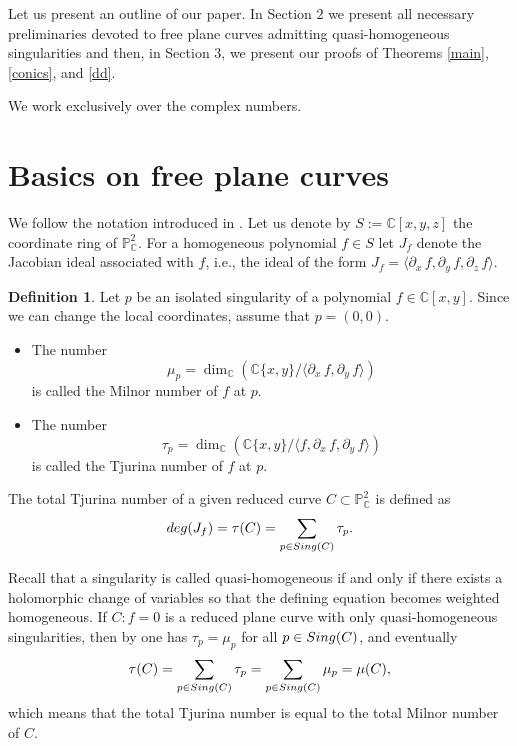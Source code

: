 \documentclass[12pt]{article}
\theoremstyle{plain}
\theoremstyle{definition}
\newtheorem{definition}[thm]{Definition}
\begin{document}
Let us present an outline of our paper. In Section $2$ we present all necessary preliminaries devoted to free plane curves admitting quasi-homogeneous singularities and then, in Section $3$, we present our proofs of Theorems \ref{main}, \ref{conics}, and \ref{dd}.

We work exclusively over the complex numbers.
\section{Basics on free plane curves}

We follow the notation introduced in \cite{Dimca}. Let us denote by $S := \mathbb{C}[x,y,z]$ the coordinate ring of $\mathbb{P}^{2}_{\mathbb{C}}$. For a homogeneous polynomial $f \in S$ let $J_{f}$ denote the Jacobian ideal associated with $f$, i.e., the ideal of the form $J_{f} = \langle \partial_{x}\, f, \partial_{y} \, f, \partial_{z} \, f \rangle$.
\begin{definition}
Let $p$ be an isolated singularity of a polynomial $f\in \mathbb{C}[x,y]$. Since we can change the local coordinates, assume that $p=(0,0)$.
\begin{itemize}
    
\item The number 
$$\mu_{p}=\dim_\mathbb{C}\left(\mathbb{C}\{x,y\} /\bigg\langle \partial_{x}\, f ,\partial_{y}\, f \bigg\rangle\right)$$
is called the Milnor number of $f$ at $p$.

\item The number
$$\tau_{p}=\dim_\mathbb{C}\left(\mathbb{C}\{x,y\}/\bigg\langle f, \partial_{x}\, f ,\partial_{y} \, f \bigg\rangle \right)$$
is called the Tjurina number of $f$ at $p$.

\end{itemize}
\end{definition}

The total Tjurina number of a given reduced curve $C \subset \mathbb{P}^{2}_{\mathbb{C}}$ is defined as
$${\rm deg}(J_{f}) = \tau(C) = \sum_{p \in {\rm Sing}(C)} \tau_{p}.$$ 

Recall that a singularity is called quasi-homogeneous if and only if there exists a holomorphic change of variables so that the defining equation becomes weighted homogeneous. If $C : f=0$ is a reduced plane curve with only quasi-homogeneous singularities,  then by \cite[Satz]{KS} one has $\tau_{p}=\mu_{p}$ for all $p \in {\rm Sing}(C)$, and eventually
$$\tau(C) = \sum_{p \in {\rm Sing}(C)} \tau_{p} = \sum_{p \in {\rm Sing}(C)} \mu_{p} = \mu(C),$$
which means that the total Tjurina number is equal to the total Milnor number of $C$.
\end{document}
